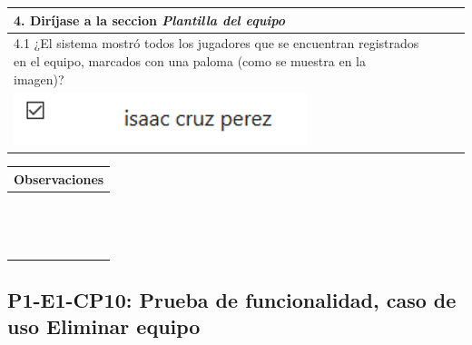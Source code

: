 \documentclass[oneside,10pt]{book}
\begin{document}
\begin{tabularx}{\textwidth}{ X l l X }
\multicolumn{4}{|l|}{4. Diríjase a la seccion \textit{Plantilla del equipo}}              \\ \hline
\multicolumn{1}{|X|}{4.1 ¿El sistema mostró todos los jugadores que se encuentran registrados en el equipo, marcados con una paloma (como se muestra en la imagen)?} & \multicolumn{1}{l|}{}   & \multicolumn{1}{l|}{}   & \multicolumn{1}{X|}{}              \\
\multicolumn{1}{|X|}{\includegraphics[scale=.5]{images/player_selected}} & \multicolumn{1}{l|}{}   & \multicolumn{1}{l|}{}   & \multicolumn{1}{X|}{}              \\ \hline

\end{tabularx}

\begin{tabularx}{\textwidth}{ X }
\multicolumn{1}{X}{\cellcolor[HTML]{9B9B9B}\textbf{Observaciones}} \\ \hline
\multicolumn{1}{|l|}{ }	\\
\multicolumn{1}{|l|}{ }	\\
\multicolumn{1}{|l|}{ }	\\
\multicolumn{1}{|l|}{ }	\\
\multicolumn{1}{|l|}{ }	\\
\multicolumn{1}{|l|}{ }	\\
\multicolumn{1}{|l|}{ }	\\
\multicolumn{1}{|l|}{ }	\\
\multicolumn{1}{|l|}{ }	\\
\multicolumn{1}{|l|}{ }	\\
\multicolumn{1}{|l|}{ }	\\
\multicolumn{1}{|l|}{ }	\\
\multicolumn{1}{|l|}{ }	\\
\multicolumn{1}{|l|}{ }	\\ \hline
\end{tabularx}
\newpage

\subsection{P1-E1-CP10: Prueba de funcionalidad, caso de uso Eliminar equipo}
\end{document}
